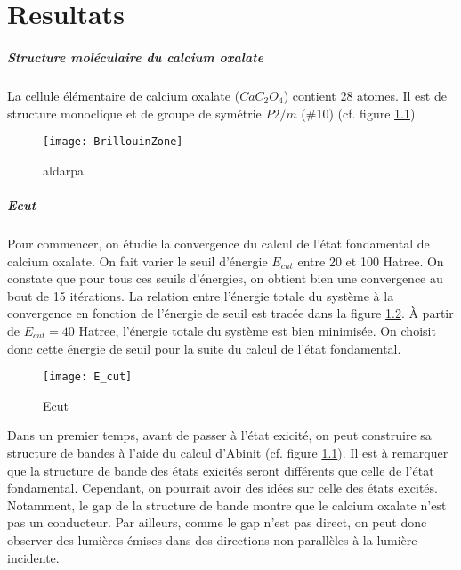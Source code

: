 \chapter{Resultats}


\label{Chap-Res}

\paragraph{Structure moléculaire du calcium oxalate}
La cellule élémentaire de calcium oxalate ($Ca C_2 O_4$) contient 28 atomes. Il est de structure monoclique et de groupe de symétrie $P2/m$ ($\#$10) (cf. figure \ref{BrillouinZone})

\begin{figure}[!h]\label{BrillouinZone}
    \centering
    \texttt{[image: BrillouinZone]}
    \caption{aldarpa}
\end{figure}
\paragraph{Ecut}
Pour commencer, on étudie la convergence du calcul de l'état fondamental de calcium oxalate. On fait varier le seuil d'énergie $E_{cut}$ entre 20 et 100 Hatree. 
On constate que pour tous ces seuils d'énergies, on obtient bien une convergence au bout de 15 itérations. La relation entre l'énergie totale du système à la convergence en fonction de l'énergie de seuil est tracée dans la figure \ref{Ecut}. 
À partir de $E_{cut} = 40$ Hatree, l'énergie totale du système est bien minimisée. On choisit donc cette énergie de seuil pour la suite du calcul de l'état fondamental. 

\begin{figure}[!h]\label{Ecut}
    \centering
    \texttt{[image: E\_cut]}
    \caption{Ecut}
\end{figure}


Dans un premier temps, avant de passer à l'état exicité, on peut construire sa structure de bandes à l'aide du calcul d'Abinit (cf. figure \ref{BrillouinZone}). 
Il est à remarquer que la structure de bande des états exicités seront différents que celle de l'état fondamental. 
Cependant, on pourrait avoir des idées sur celle des états excités. 
Notamment, le gap de la structure de bande montre que le calcium oxalate n'est pas un conducteur. 
Par ailleurs, comme le gap n'est pas direct, on peut donc observer des lumières émises dans des directions non parallèles à la lumière incidente. 

